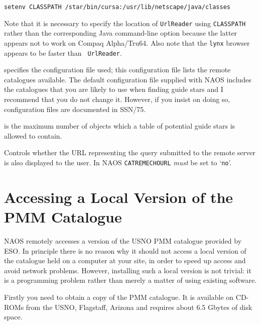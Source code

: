 \documentclass[twoside,11pt]{article}
\newcommand{\xref}[3]{#1}
\newcommand{\xlabel}[1]{}
\renewcommand{\_}{\texttt{\symbol{95}}}
\begin{document}
\begin{description}
  \begin{center}
   {\small \tt setenv~CLASSPATH~/star/bin/cursa:/usr/lib/netscape/java/classes}
  \end{center}

   Note that it is necessary to specify the location of {\tt UrlReader} using
   {\tt CLASSPATH} rather than the corresponding Java command-line option
   because the latter appears not to work on Compaq Alpha/Tru64.  Also
   note that the {\tt lynx} browser appears to be faster than {\tt
   UrlReader}.

  \item[{\tt CATREM\_CONFIG}] specifies the configuration file used;
   this configuration file lists the remote catalogues available.  The
   default configuration file supplied with NAOS includes the catalogues
   that you are likely to use when finding guide stars and I recommend
   that you do not change it.  However, if you insist on doing so,
   configuration files are documented in \xref{SSN/75}{ssn75}{}\cite{SSN75}.

  \item[{\tt CATREM\_MAXOBJ}] is the maximum number of objects which a
   table of potential guide stars is allowed to contain.

  \item[{\tt CATREM\_ECHOURL}] Controls whether the URL representing the
   query submitted to the remote server is also displayed to the user.
   In NAOS {\tt CATREM\_ECHOURL} {\it must}\/ be set to `{\tt no}'.

\end{description}


\section{\xlabel{ACCLOC}\label{ACCLOC}Accessing a Local Version of the
PMM Catalogue}

NAOS remotely accesses a version of the USNO PMM catalogue\cite{PMM} 
provided by ESO.  In principle there is no reason why it should not
access a local version of the catalogue held on a computer at your site,
in order to speed up access and avoid network problems.  However,
installing such a local version is not trivial: it is a programming problem
rather than merely a matter of using existing software.

Firstly you need to obtain a copy of the PMM catalogue.  It is available
on CD-ROMs from the USNO, Flagstaff, Arizona and requires about 6.5 Gbytes
of disk space.
\end{document}
